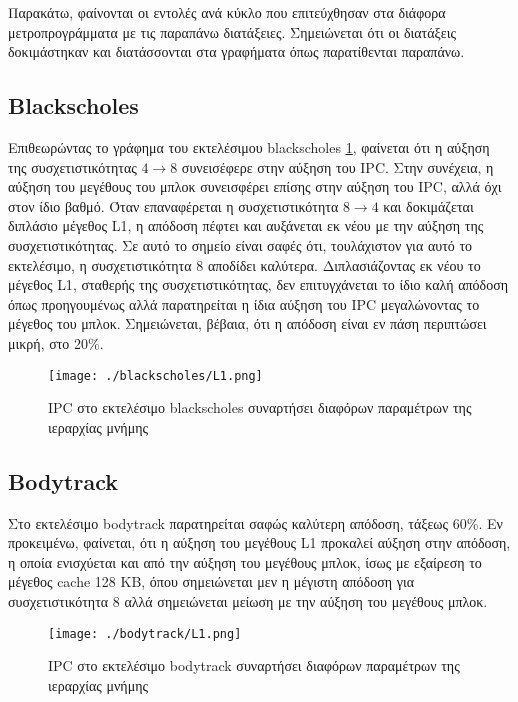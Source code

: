 \documentclass{article}
\newcommand{\eng}[1]{\foreignlanguage{english}{#1}}
\begin{document}
Παρακάτω, φαίνονται οι εντολές ανά κύκλο που επιτεύχθησαν στα διάφορα μετροπρογράμματα με τις παραπάνω διατάξειες. Σημειώνεται ότι οι διατάξεις δοκιμάστηκαν και διατάσσονται στα γραφήματα όπως παρατίθενται παραπάνω.


\graphicspath{{../parsec-3.0/parsec_workspace/outputs/exp1/}}
\clearpage
\subsection{\eng{Blackscholes}}

Επιθεωρώντας το γράφημα του εκτελέσιμου \eng{blackscholes} \ref{fig:exp1-blackscholes}, φαίνεται ότι η αύξηση της συσχετιστικότητας $4 \rightarrow 8$ συνεισέφερε στην αύξηση του \eng{IPC}. Στην συνέχεια, η αύξηση του μεγέθους του μπλοκ συνεισφέρει επίσης στην αύξηση του \eng{IPC}, αλλά όχι στον ίδιο βαθμό. Όταν επαναφέρεται η συσχετιστικότητα  $8 \rightarrow 4$ και δοκιμάζεται διπλάσιο μέγεθος \eng{L1}, η απόδοση πέφτει και αυξάνεται εκ νέου με την αύξηση της συσχετιστικότητας.  Σε αυτό το σημείο είναι σαφές ότι, τουλάχιστον για αυτό το εκτελέσιμο, η συσχετιστικότητα 8 αποδίδει καλύτερα. Διπλασιάζοντας εκ νέου το μέγεθος \eng{L1}, σταθερής της συσχετιστικότητας, δεν επιτυγχάνεται το ίδιο καλή απόδοση όπως προηγουμένως αλλά παρατηρείται η ίδια αύξηση του \eng{IPC} μεγαλώνοντας το μέγεθος του μπλοκ. Σημειώνεται, βέβαια, ότι η απόδοση είναι εν πάση περιπτώσει μικρή, στο 20\%.

\begin{figure}[h]
    \centering
    \texttt{[image: ./blackscholes/L1.png]} 
    \caption{\eng{IPC} στο εκτελέσιμο \eng{blackscholes} συναρτήσει διαφόρων παραμέτρων της ιεραρχίας μνήμης}
    \label{fig:exp1-blackscholes}
\end{figure}
\FloatBarrier

\clearpage
\subsection{\eng{Bodytrack}}

Στο εκτελέσιμο \eng{bodytrack} παρατηρείται σαφώς καλύτερη απόδοση, τάξεως 60\%. Εν προκειμένω, φαίνεται, ότι η αύξηση του μεγέθους \eng{L1} προκαλεί αύξηση στην απόδοση, η οποία ενισχύεται και από την αύξηση του μεγέθους μπλοκ, ίσως με εξαίρεση το μέγεθος \eng{cache} 128 ΚΒ, όπου σημειώνεται μεν η μέγιστη απόδοση για συσχετιστικότητα 8 αλλά σημειώνεται μείωση με την αύξηση του μεγέθους μπλοκ.

\begin{figure}[h]
    \centering
    \texttt{[image: ./bodytrack/L1.png]} 
    \caption{\eng{IPC} στο εκτελέσιμο \eng{bodytrack} συναρτήσει διαφόρων παραμέτρων της ιεραρχίας μνήμης}
    \label{fig:exp1-bodytrack}
\end{figure}
\FloatBarrier
\end{document}
